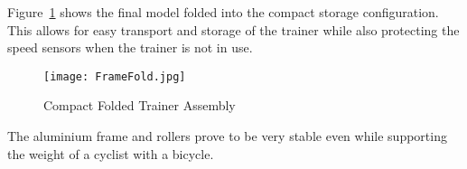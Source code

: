 \vspace*{-0.5cm}

Figure~\ref{fig:2} shows the final model folded into the compact storage configuration. This allows for easy transport and storage of the trainer while also protecting the speed sensors when the trainer is not in use.

\begin{figure}[H]
	\centering
	\texttt{[image: FrameFold.jpg]}
	\caption{Compact Folded Trainer Assembly}
	\label{fig:2}
\end{figure}

\vspace*{-0.5cm}

The aluminium frame and rollers prove to be very stable even while supporting the weight of a cyclist with a bicycle.